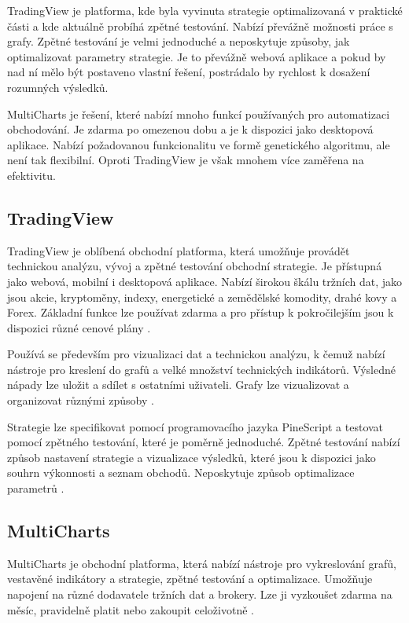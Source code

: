 TradingView je platforma, kde byla vyvinuta strategie optimalizovaná v praktické části a kde aktuálně probíhá zpětné testování.
Nabízí převážně možnosti práce s grafy.
Zpětné testování je velmi jednoduché a neposkytuje způsoby, jak optimalizovat parametry strategie.
Je to převážně webová aplikace a pokud by nad ní mělo být postaveno vlastní řešení, postrádalo by rychlost k dosažení rozumných výsledků.

MultiCharts je řešení, které nabízí mnoho funkcí používaných pro automatizaci obchodování.
Je zdarma po omezenou dobu a je k dispozici jako desktopová aplikace.
Nabízí požadovanou funkcionalitu ve formě genetického algoritmu, ale není tak flexibilní.
Oproti TradingView je však mnohem více zaměřena na efektivitu.

\subsection{TradingView}
TradingView je oblíbená obchodní platforma, která umožňuje provádět technickou analýzu, vývoj a zpětné testování obchodní strategie.
Je přístupná jako webová, mobilní i desktopová aplikace. 
Nabízí širokou škálu tržních dat, jako jsou akcie, kryptoměny, indexy, energetické a zemědělské komodity, drahé kovy a Forex.
Základní funkce lze používat zdarma a pro přístup k pokročilejším jsou k dispozici různé cenové plány \cite{bowman}.

Používá se především pro vizualizaci dat a technickou analýzu, k čemuž nabízí nástroje pro kreslení do grafů a velké množství technických indikátorů.
Výsledné nápady lze uložit a sdílet s ostatními uživateli.
Grafy lze vizualizovat a organizovat různými způsoby \cite{tradingview}.

Strategie lze specifikovat pomocí programovacího jazyka PineScript a testovat pomocí zpětného testování, které je poměrně jednoduché.
Zpětné testování nabízí způsob nastavení strategie a vizualizace výsledků, které jsou k dispozici jako souhrn výkonnosti a seznam obchodů.
Neposkytuje způsob optimalizace parametrů \cite{tradingview}.

\subsection{MultiCharts}
MultiCharts je obchodní platforma, která nabízí nástroje pro vykreslování grafů, vestavěné indikátory a strategie, zpětné testování a optimalizace.
Umožňuje napojení na různé dodavatele tržních dat a brokery.
Lze ji vyzkoušet zdarma na měsíc, pravidelně platit nebo zakoupit celoživotně \cite{multicharts}.

